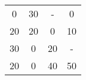 \begin{tabular}{cccc}
0      & 30     & -      & 0 \\
20     & 20     & 0      & 10 \\
30     & 0      & 20     & - \\
20     & 0      & 40     & 50 \bigstrut[b]\\
\hline
\hline
\end{tabular}%
